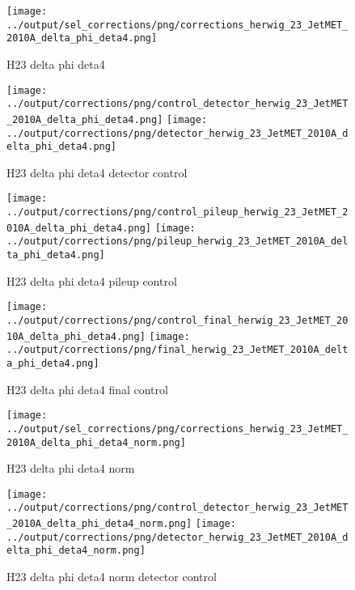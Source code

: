 \documentclass[11pt]{book}
\begin{document}
\begin{figure}[ht]
\centering
\texttt{[image: ../output/sel\_corrections/png/corrections\_herwig\_23\_JetMET\_2010A\_delta\_phi\_deta4.png]}
\caption{H23 delta phi deta4}
\label{fig:H23_JetMET_2010A_delta_phi_deta4}
\end{figure}


\begin{figure}[ht]
\centering
\texttt{[image: ../output/corrections/png/control\_detector\_herwig\_23\_JetMET\_2010A\_delta\_phi\_deta4.png]}
\texttt{[image: ../output/corrections/png/detector\_herwig\_23\_JetMET\_2010A\_delta\_phi\_deta4.png]}
\caption{H23 delta phi deta4 detector control}
\label{fig:H23_JetMET_2010A_delta_phi_deta4_detector_control}
\end{figure}

\begin{figure}[ht]
\centering
\texttt{[image: ../output/corrections/png/control\_pileup\_herwig\_23\_JetMET\_2010A\_delta\_phi\_deta4.png]}
\texttt{[image: ../output/corrections/png/pileup\_herwig\_23\_JetMET\_2010A\_delta\_phi\_deta4.png]}
\caption{H23 delta phi deta4 pileup control}
\label{fig:H23_JetMET_2010A_delta_phi_deta4_pileup_control}
\end{figure}


\begin{figure}[ht]
\centering
\texttt{[image: ../output/corrections/png/control\_final\_herwig\_23\_JetMET\_2010A\_delta\_phi\_deta4.png]}
\texttt{[image: ../output/corrections/png/final\_herwig\_23\_JetMET\_2010A\_delta\_phi\_deta4.png]}
\caption{H23 delta phi deta4 final control}
\label{fig:H23_JetMET_2010A_delta_phi_deta4_final_control}
\end{figure}


\begin{figure}[ht]
\centering
\texttt{[image: ../output/sel\_corrections/png/corrections\_herwig\_23\_JetMET\_2010A\_delta\_phi\_deta4\_norm.png]}
\caption{H23 delta phi deta4 norm}
\label{fig:H23_JetMET_2010A_delta_phi_deta4_norm}
\end{figure}

\begin{figure}[ht]
\centering
\texttt{[image: ../output/corrections/png/control\_detector\_herwig\_23\_JetMET\_2010A\_delta\_phi\_deta4\_norm.png]}
\texttt{[image: ../output/corrections/png/detector\_herwig\_23\_JetMET\_2010A\_delta\_phi\_deta4\_norm.png]}
\caption{H23 delta phi deta4 norm detector control}
\label{fig:H23_JetMET_2010A_delta_phi_deta4_norm_detector_control}
\end{figure}
\end{document}
